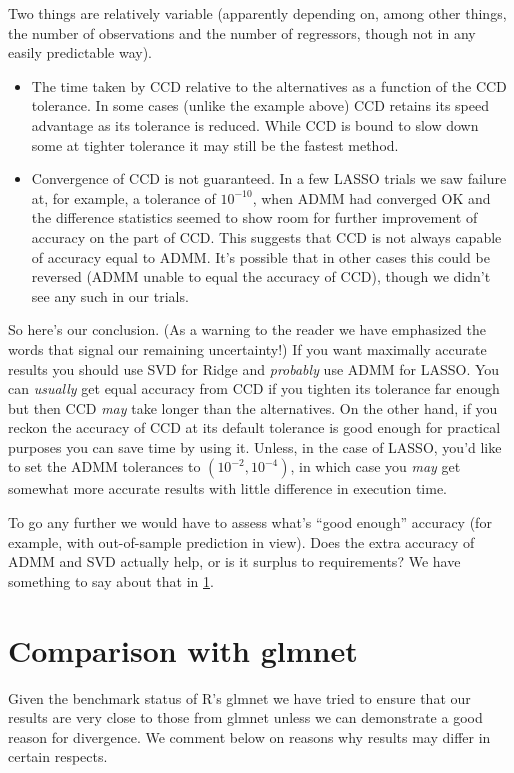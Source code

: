 \documentclass{article}
\newcommand{\myappendix}[1]{%
\addtocounter{appcount}{1}
\section{#1}}
\begin{document}
Two things are relatively variable (apparently depending on, among other
things, the number of observations and the number of regressors,
though not in any easily predictable way).
\begin{itemize}
\item The time taken by CCD relative to the alternatives as a function
  of the CCD tolerance. In some cases (unlike the example above) CCD
  retains its speed advantage as its tolerance is reduced. While CCD
  is bound to slow down some at tighter tolerance it may still be the
  fastest method.
\item Convergence of CCD is not guaranteed. In a few LASSO trials we
  saw failure at, for example, a tolerance of $10^{-10}$, when ADMM
  had converged OK and the difference statistics seemed to show room
  for further improvement of accuracy on the part of CCD. This
  suggests that CCD is not always capable of accuracy equal to
  ADMM. It's possible that in other cases this could be reversed (ADMM
  unable to equal the accuracy of CCD), though we didn't see any such
  in our trials.
\end{itemize}

So here's our conclusion. (As a warning to the reader we have
emphasized the words that signal our remaining uncertainty!)  If you
want maximally accurate results you should use SVD for Ridge and
\textit{probably} use ADMM for LASSO. You can \textit{usually} get
equal accuracy from CCD if you tighten its tolerance far enough but
then CCD \textit{may} take longer than the alternatives. On the other
hand, if you reckon the accuracy of CCD at its default tolerance is
good enough for practical purposes you can save time by using it.
Unless, in the case of LASSO, you'd like to set the ADMM tolerances to
$(10^{-2}, 10^{-4})$, in which case you \textit{may} get somewhat more
accurate results with little difference in execution time.

To go any further we would have to assess what's ``good enough''
accuracy (for example, with out-of-sample prediction in view). Does
the extra accuracy of ADMM and SVD actually help, or is it surplus to
requirements? We have something to say about that in
\ref{app:glmnet-comp}.

\myappendix{Comparison with glmnet}
\label{app:glmnet-comp}

Given the benchmark status of \textsf{R}'s \textsf{glmnet} we have
tried to ensure that our results are very close to those from
\textsf{glmnet} unless we can demonstrate a good reason for
divergence. We comment below on reasons why results may differ in
certain respects.
\end{document}
